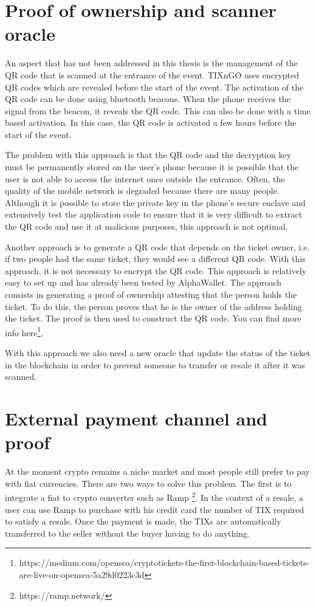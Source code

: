 \documentclass[a4paper,11pt,oneside]{report}
\begin{document}
\section{Proof of ownership and scanner oracle}
An aspect that has not been addressed in this thesis is the management of the QR code that is scanned at the entrance of the event. TIXnGO uses encrypted QR codes which are revealed before the start of the event. The activation of the QR code can be done using bluetooth beacons. When the phone receives the signal from the beacon, it reveals the QR code. This can also be done with a time based activation. In this case, the QR code is activated a few hours before the start of the event.

The problem with this approach is that the QR code and the decryption key must be permanently stored on the user's phone because it is possible that the user is not able to access the internet once outside the entrance. Often, the quality of the mobile network is degraded because there are many people. Although it is possible to store the private key in the phone's secure enclave and extensively test the application code to ensure that it is very difficult to extract the QR code and use it at malicious purposes, this approach is not optimal.

Another approach is to generate a QR code that depends on the ticket owner, i.e. if two people had the same ticket, they would see a different QR code. With this approach, it is not necessary to encrypt the QR code. This approach is relatively easy to set up and has already been tested by AlphaWallet. The approach consists in generating a proof of ownership attesting that the person holds the ticket. To do this, the person proves that he is the owner of the address holding the ticket. The proof is then used to construct the QR code. You can find more info here\footnote{https://medium.com/opensea/cryptotickets-the-first-blockchain-based-tickets-are-live-on-opensea-5a29d0223c3d}.

With this approach we also need a new oracle that update the status of the ticket in the blockchain in order to prevent someone to transfer or resale it after it was scanned. 

\section{External payment channel and proof}
At the moment crypto remains a niche market and most people still prefer to pay with fiat currencies. There are two ways to solve this problem. The first is to integrate a fiat to crypto converter such as Ramp \footnote{https://ramp.network/}. In the context of a resale, a user can use Ramp to purchase with his credit card the number of TIX required to satisfy a resale. Once the payment is made, the TIXs are automatically transferred to the seller without the buyer having to do anything.
\end{document}
